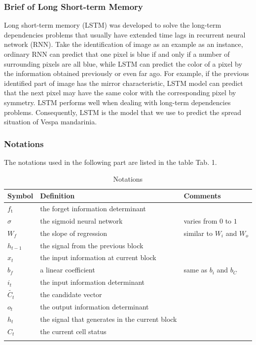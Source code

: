 \documentclass{mcmthesis}
\begin{document}
\subsubsection{Brief of Long Short-term Memory}
Long short-term memory (LSTM) was developed to solve the long-term dependencies problems that usually have extended time lags in recurrent neural network (RNN). Take the identification of image as an example as an instance, ordinary RNN can predict that one pixel is blue if and only if a number of surrounding pixels are all blue, while LSTM can predict the color of a pixel by the information obtained previously or even far ago. For example, if the previous identified part of image has the mirror characteristic, LSTM model can predict that the next pixel may have the same color with the corresponding pixel by symmetry. LSTM performs well when dealing with long-term dependencies problems.
Consequently, LSTM is the model that we use to predict the spread situation of Vespa mandarinia.
\subsubsection{Notations}
The notations used in the following part are listed in the table Tab. 1.

\begin{table}[htbp]
\centering
\begin{tabular}{lll}
\hline 
Symbol & Definition & Comments \\
\hline
$f_{\text {t }}$ & the forget information determinant & \\
$\sigma$ & the sigmoid neural network & varies from 0 to $1$ \\
$W_{f}$ & the slope of regression & similar to $W_{i} $ and $W_{o}$\\
$h_{t-1}$ & the signal from the previous block & \\
$x_{t}$ & the input information at current block & \\
$b_{f}$ & a linear coefficient & same as $b_{i}$ and $b_{C}$\\
$i_{t }$ & the input information determinant &  \\
$\tilde{C_{t }}$ & the candidate vector &  \\
$o_{t }$ & the output information determinant &  \\
$h_{t }$ & the signal that generates in the current block &  \\
$C_{t }$ & the current cell status  &  \\
\hline
\label{tab:1}
\end{tabular}
\caption{Notations}
\end{table}
\end{document}
